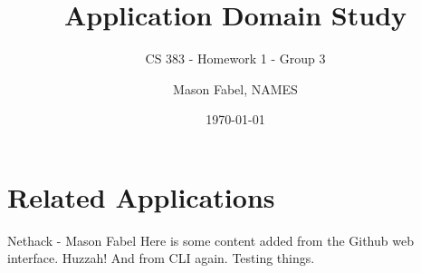 \documentclass[12pt]{report}
\title{Application Domain Study}
\subtitle{CS 383 - Homework 1 - Group 3}
\author{Mason Fabel, NAMES} %
\date{\today}
\begin{document}
\maketitle

\chapter{Related Applications}


\begin{section}{Nethack - Mason Fabel}
Here is some content added from the Github web interface. Huzzah!
And from CLI again. Testing things.
\end{section}
\end{document}
